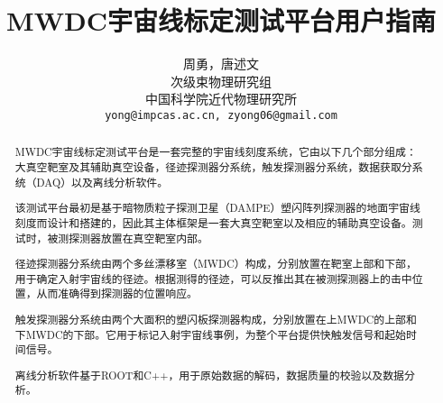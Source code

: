 \documentclass[a4paper,12pt]{ctexrep}
\begin{document}
	\title{\textbf{MWDC宇宙线标定测试平台用户指南}}
	\author{周勇，唐述文\\
	次级束物理研究组\\
	中国科学院近代物理研究所\\
	\texttt{yong@impcas.ac.cn, zyong06@gmail.com}}

	\maketitle

	\begin{abstract}
	MWDC宇宙线标定测试平台是一套完整的宇宙线刻度系统，它由以下几个部分组成：大真空靶室及其辅助真空设备，径迹探测器分系统，触发探测器分系统，数据获取分系统（DAQ）以及离线分析软件。

	该测试平台最初是基于暗物质粒子探测卫星（DAMPE）塑闪阵列探测器的地面宇宙线刻度而设计和搭建的，因此其主体框架是一套大真空靶室以及相应的辅助真空设备。测试时，被测探测器放置在真空靶室内部。

	径迹探测器分系统由两个多丝漂移室（MWDC）构成，分别放置在靶室上部和下部，用于确定入射宇宙线的径迹。根据测得的径迹，可以反推出其在被测探测器上的击中位置，从而准确得到探测器的位置响应。

	触发探测器分系统由两个大面积的塑闪板探测器构成，分别放置在上MWDC的上部和下MWDC的下部。它用于标记入射宇宙线事例，为整个平台提供快触发信号和起始时间信号。

	离线分析软件基于ROOT和C++，用于原始数据的解码，数据质量的校验以及数据分析。
	\end{abstract}

	\tableofcontents
	\listoffigures
	\listoftables
	
	

	

	

	
\end{document}
